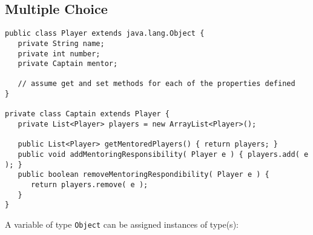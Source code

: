 \documentclass[11pt]{exam}
\begin{document}
\begin{questions}
\begin{parts}
  \part[2] \makebox[2in]{\hrulefill}
  \part[2] \makebox[2in]{\hrulefill}
  \part[2] \makebox[2in]{\hrulefill}
\end{parts}

\newpage
\section*{Multiple Choice}
\begin{lstlisting}
public class Player extends java.lang.Object {
   private String name;
   private int number;
   private Captain mentor;
   
   // assume get and set methods for each of the properties defined
}

private class Captain extends Player {
   private List<Player> players = new ArrayList<Player>();

   public List<Player> getMentoredPlayers() { return players; }
   public void addMentoringResponsibility( Player e ) { players.add( e ); }
   public boolean removeMentoringRespondibility( Player e ) { 
      return players.remove( e ); 
   }
}
\end{lstlisting}

\question[2] A variable of type {\tt Object} can be assigned instances of type(s):
 

\end{questions}
\end{document}
